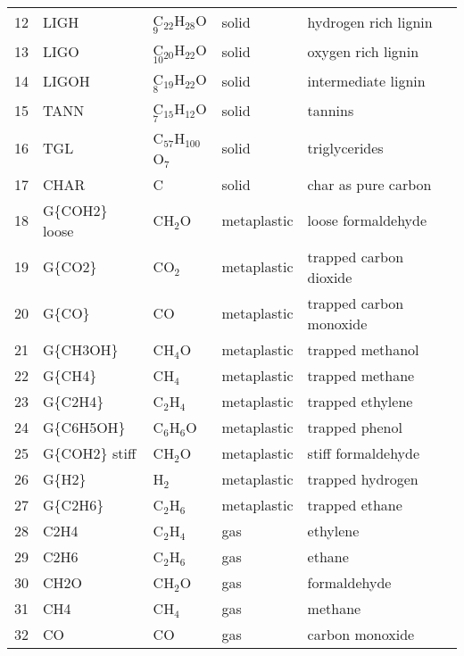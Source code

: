 \begin{center}
\begin{longtable}{lllll}
        12 & LIGH           & C$_{22}$H$_{28}$O$_9$   & solid       & hydrogen rich lignin \\
        13 & LIGO           & C$_{20}$H$_{22}$O$_10$  & solid       & oxygen rich lignin \\
        14 & LIGOH          & C$_{19}$H$_{22}$O$_8$   & solid       & intermediate lignin \\
        15 & TANN           & C$_{15}$H$_{12}$O$_7$   & solid       & tannins \\
        16 & TGL            & C$_{57}$H$_{100}$O$_7$  & solid       & triglycerides \\
        17 & CHAR           & C                       & solid       & char as pure carbon \\
        18 & G\{COH2\} loose& CH$_2$O                 & metaplastic & loose formaldehyde \\
        19 & G\{CO2\}       & CO$_2$                  & metaplastic & trapped carbon dioxide \\
        20 & G\{CO\}        & CO                      & metaplastic & trapped carbon monoxide \\
        21 & G\{CH3OH\}     & CH$_4$O                 & metaplastic & trapped methanol \\
        22 & G\{CH4\}       & CH$_4$                  & metaplastic & trapped methane \\
        23 & G\{C2H4\}      & C$_2$H$_4$              & metaplastic & trapped ethylene \\
        24 & G\{C6H5OH\}    & C$_6$H$_6$O             & metaplastic & trapped phenol \\
        25 & G\{COH2\} stiff& CH$_2$O                 & metaplastic & stiff formaldehyde \\
        26 & G\{H2\}        & H$_2$                   & metaplastic & trapped hydrogen \\
        27 & G\{C2H6\}      & C$_2$H$_6$              & metaplastic & trapped ethane \\
        28 & C2H4           & C$_2$H$_4$              & gas         & ethylene \\
        29 & C2H6           & C$_2$H$_6$              & gas         & ethane \\
        30 & CH2O           & CH$_2$O                 & gas         & formaldehyde \\
        31 & CH4            & CH$_4$                  & gas         & methane \\
        32 & CO             & CO                      & gas         & carbon monoxide \\

\end{longtable}
\end{center}
